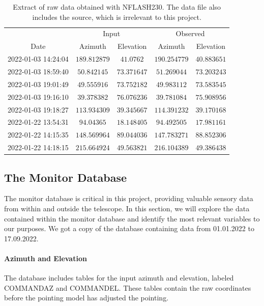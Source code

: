 \begin{table}[h]
    \centering
    \caption{Extract of raw data obtained with NFLASH230. The data file also includes the source, which is irrelevant to this project.}
    \begin{tabular}{ccccc}
         & \multicolumn{2}{c}{Input} & \multicolumn{2}{c}{Observed} \\ 
        \cline{2-3} \cline{4-5}
        Date & Azimuth & Elevation & Azimuth & Elevation \\ 
        \hline
        2022-01-03 14:24:04 & $189.812879$ & $41.0762$ & $190.254779$ & $40.883651$ \\
        2022-01-03 18:59:40 & $50.842145$ & $73.371647$ & $51.269044$ & $73.203243$ \\
        2022-01-03 19:01:49 & $49.555916$ & $73.752182$ & $49.983112$ & $73.583545$ \\
        2022-01-03 19:16:10 & $39.378382$ & $76.076236$ & $39.781084$ & $75.908956$ \\
        2022-01-03 19:18:27 & $113.934309$ & $39.345667$ & $114.391232$ & $39.170168$ \\
        2022-01-22 13:54:31 & $94.04365$ & $18.148405$ & $94.492505$ & $17.981161$ \\
        2022-01-22 14:15:35 & $148.569964$ & $89.044036$ & $147.783271$ & $88.852306$ \\
        2022-01-22 14:18:15 & $215.664924$ & $49.563821$ & $216.104389$ & $49.386438$ \\
    \end{tabular}
    \label{tab:raw_datanflash230}
    \end{table}



\subsection{The Monitor Database}
The monitor database is critical in this project, providing valuable sensory data from within and outside the telescope.
In this section, we will explore the data contained within the monitor database and identify the most relevant variables to our purposes.
We got a copy of the database containing data from 01.01.2022 to 17.09.2022.

\paragraph{Azimuth and Elevation}
The database includes tables for the input azimuth and elevation, labeled COMMANDAZ and COMMANDEL.
These tables contain the raw coordinates before the pointing model has adjusted the pointing.

